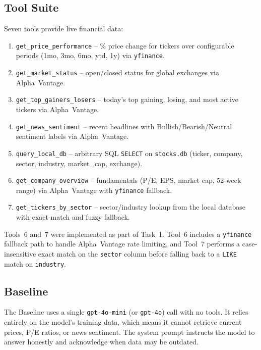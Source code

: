 \documentclass[conference]{IEEEtran}
\begin{document}
\subsection{Tool Suite}

Seven tools provide live financial data:

\begin{enumerate}
  \item \texttt{get\_price\_performance} -- \% price change for tickers over configurable
        periods (1mo, 3mo, 6mo, ytd, 1y) via \texttt{yfinance}.
  \item \texttt{get\_market\_status} -- open/closed status for global exchanges via
        Alpha~Vantage.
  \item \texttt{get\_top\_gainers\_losers} -- today's top gaining, losing, and most active
        tickers via Alpha~Vantage.
  \item \texttt{get\_news\_sentiment} -- recent headlines with Bullish/Bearish/Neutral
        sentiment labels via Alpha~Vantage.
  \item \texttt{query\_local\_db} -- arbitrary SQL \texttt{SELECT} on \texttt{stocks.db}
        (ticker, company, sector, industry, market\_cap, exchange).
  \item \texttt{get\_company\_overview} -- fundamentals (P/E, EPS, market cap, 52-week
        range) via Alpha~Vantage with \texttt{yfinance} fallback.
  \item \texttt{get\_tickers\_by\_sector} -- sector/industry lookup from the local
        database with exact-match and fuzzy fallback.
\end{enumerate}

Tools~6 and~7 were implemented as part of Task~1.  Tool~6 includes a \texttt{yfinance}
fallback path to handle Alpha~Vantage rate limiting, and Tool~7 performs a case-insensitive
exact match on the \texttt{sector} column before falling back to a \texttt{LIKE} match on
\texttt{industry}.

\subsection{Baseline}

The Baseline uses a single \texttt{gpt-4o-mini} (or \texttt{gpt-4o}) call with no tools.
It relies entirely on the model's training data, which means it cannot retrieve current
prices, P/E ratios, or news sentiment.  The system prompt instructs the model to answer
honestly and acknowledge when data may be outdated.
\end{document}
